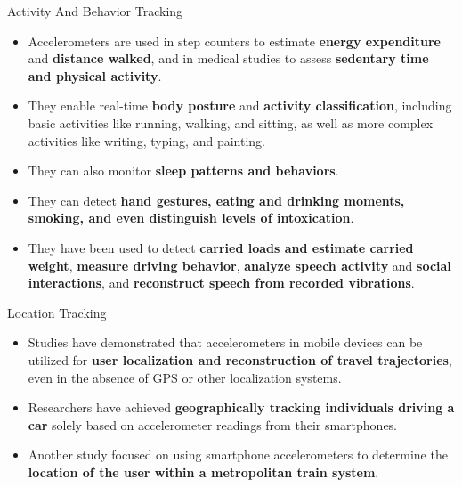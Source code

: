 \documentclass[ucs,9pt]{beamer}
\begin{document}
\begin{frame}{Activity And Behavior Tracking}
\begin{itemize}
	\item Accelerometers are used in step counters to estimate \textbf{energy expenditure} and \textbf{distance walked}, and in medical studies to assess \textbf{sedentary time and physical activity}.
	\item They enable real-time \textbf{body posture} and \textbf{activity
	classification}, including basic activities like running, walking,
	and sitting, as well as more complex activities like writing,
	typing, and painting. 
	\item They can also monitor \textbf{sleep patterns
	and behaviors}. 
	\item They can detect \textbf{hand 	gestures, eating and drinking moments, smoking, and even
	distinguish levels of intoxication}. 
	\item They have been used to detect \textbf{carried loads and estimate carried weight}, \textbf{measure driving behavior}, \textbf{analyze speech activity} and \textbf{social interactions}, and
	\textbf{reconstruct speech from recorded vibrations}. 
\end{itemize}
\end{frame}


\begin{frame}{Location Tracking}
\begin{itemize}
	\item Studies have demonstrated that accelerometers in mobile
	devices can be utilized for \textbf{user localization and reconstruction
	of travel trajectories}, even in the absence of GPS or other localization systems.
	\item Researchers have achieved \textbf{geographically tracking individuals driving a car} solely based on accelerometer readings from their smartphones.
	\item Another study focused on using smartphone accelerometers to determine the \textbf{location of the user within a metropolitan train system}. 
\end{itemize}
\end{frame}
\end{document}
